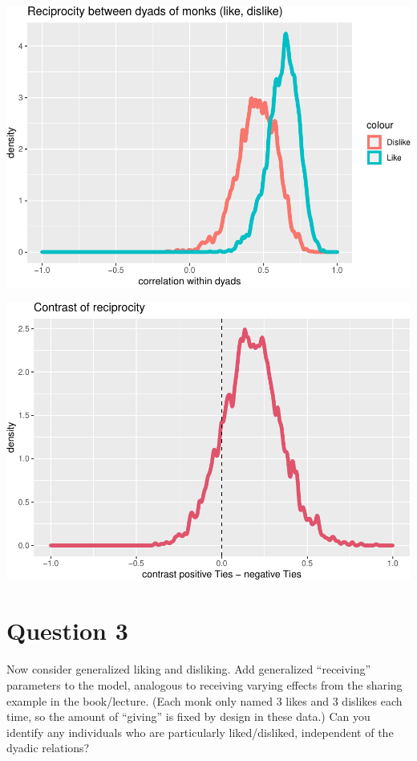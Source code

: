 \documentclass[
]{article}
\begin{document}
\begin{center}\includegraphics{Geraldes-week08_files/figure-latex/unnamed-chunk-12-1} \end{center}

\begin{center}\includegraphics{Geraldes-week08_files/figure-latex/unnamed-chunk-12-2} \end{center}

\hypertarget{question-3}{%
\section{Question 3}\label{question-3}}

Now consider generalized liking and disliking. Add generalized
``receiving'' parameters to the model, analogous to receiving varying
effects from the sharing example in the book/lecture. (Each monk only
named 3 likes and 3 dislikes each time, so the amount of ``giving'' is
fixed by design in these data.) Can you identify any individuals who are
particularly liked/disliked, independent of the dyadic relations?
\end{document}
